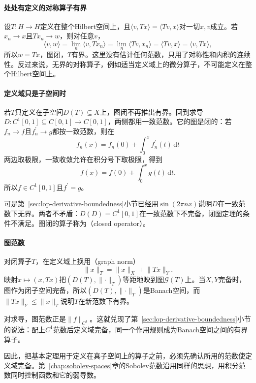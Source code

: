 \paragraph{处处有定义的对称算子有界}
设$T:H\to H$定义在整个Hilbert空间上，且$\langle v,Tx\rangle=\langle Tv,x\rangle$对一切$x,v$成立。若$x_n\to x$且$Tx_n\to w$，则对任意$v$，
\[
 \langle v,w\rangle=\lim_n\langle v,Tx_n\rangle=\lim_n\langle Tv,x_n\rangle=\langle Tv,x\rangle=\langle v,Tx\rangle ,
\]
所以$w=Tx$，图闭，$T$有界。这里没有估计任何范数，只用了对称性和内积的连续性。反过来说，无界的对称算子，例如适当定义域上的微分算子，不可能定义在整个Hilbert空间上。

\paragraph{定义域只是子空间时}
若$T$只定义在子空间$D(T)\subseteq X$上，图闭不再推出有界。回到求导$D:C^1[0,1]\subseteq C[0,1]\to C[0,1]$，两侧都用一致范数。它的图是闭的：若$f_n\to f$且$f_n^\prime\to g$都按一致范数，则在
\[
 f_n(x)=f_n(0)+\int_0^xf_n^\prime(t)\,\mathrm dt
\]
两边取极限，一致收敛允许在积分号下取极限，得到
\[
 f(x)=f(0)+\int_0^xg(t)\,\mathrm dt.
\]
所以$f\in C^1[0,1]$且$f^\prime=g$。

可是第~\ref{sec:lop-derivative-boundedness}小节已经用$\sin(2\pi nx)$说明$D$在一致范数下无界。两者不矛盾：$D(D)=C^1[0,1]$在一致范数下不完备，闭图定理的条件不满足。图闭的算子称为（closed operator）。

\paragraph{图范数}
对闭算子$T$，在定义域上换用（graph norm）
\begin{equation}
 \lVert x\rVert_T=\lVert x\rVert_X+\lVert Tx\rVert_Y.
 \label{eq:lop-graph-norm}
\end{equation}
映射$x\mapsto(x,Tx)$把$(D(T),\lVert\cdot\rVert_T)$等距地映到图$\mathcal G(T)$上。当$X,Y$完备时，图作为闭子空间完备，所以$(D(T),\lVert\cdot\rVert_T)$是Banach空间，而$\lVert Tx\rVert_Y\leq\lVert x\rVert_T$说明$T$在新范数下有界。

对求导，图范数正是$\lVert f\rVert_{C^1}$。这就兑现了第~\ref{sec:lop-derivative-boundedness}小节的说法：配上$C^1$范数后定义域完备，同一个作用规则成为Banach空间之间的有界算子。

因此，把基本定理用于定义在真子空间上的算子之前，必须先确认所用的范数使定义域完备。第~\ref{chap:sobolev-spaces}章的Sobolev范数沿用同样的思想，用积分范数同时控制函数和它的弱导数。
